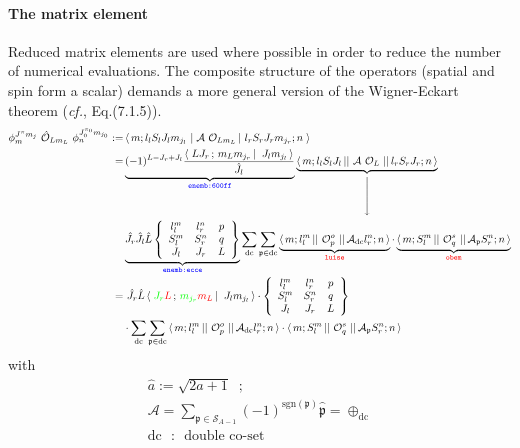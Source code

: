 \documentclass[onecolumn,preprint,superscriptaddress,nofootinbib,notitlepage,10pt,linenumbers]{revtex4-1}
\newcommand{\xdownarrow}[1]{%
  {\left\downarrow\vbox to #1{}\right.\kern-\nulldelimiterspace}
}
\newcommand{\red}[1]{\textcolor{red}{#1}}
\newcommand{\blue}[1]{\textcolor{blue}{#1}}
\newcommand{\green}[1]{\textcolor{green}{#1}}
\newcommand{\cf}{\textit{cf.}\;}
\newcommand{\la}{\label}
\newcommand{\me}[3] {\left\langle\,#1\,\left|\left.\,#2\,\right|\,#3\,\right.\right\rangle}
\newcommand{\redme}[3] {\left\langle\,#1\,\middle|\right|\,#2\,\left|\middle|\,#3\,\right\rangle}
\newcommand{\clg}[6]{\ensuremath{\left\langle\left.\,#1#2\,;\,#3#4\,\right\vert\right.\left.\,#5#6\,\right\rangle}}
\begin{document}
\paragraph{The matrix element}
Reduced matrix elements are used where possible in order to reduce the number of numerical evaluations.
The composite structure of the operators (spatial and spin form a scalar) demands a more general version
of the Wigner-Eckart theorem (\cf\cite{edmonds_book}, Eq.(7.1.5)).
\begin{align}\la{eq.me}
\phi^{J^\pi m_j}_m~\hat{\mathcal{O}}_{Lm_L}~\phi^{J_0^{\pi_0}m_{j_0}}_n:=&
\me{m;l_lS_lJ_lm_{j_l}}{\mathcal{A}~\mathcal{O}_{Lm_L}}{l_rS_rJ_rm_{j_r};n} \\
=&\underbrace{(-1)^{L-J_r+J_l}\frac{\clg{L}{J_r}{m_L}{m_{j_r}}{J_l}{m_{j_l}}}{\hat{J_l}}}_
{\blue{\texttt{enemb:600ff}}}
\underbrace{\redme{m;l_lS_lJ_l}{\mathcal{A}~\mathcal{O}_{L}}{l_rS_rJ_r;n}}_{\xdownarrow{.75cm}}\\
&\underbrace{\hat{J_r}\hat{J_l}\hat{L}
\left\lbrace\begin{array}{ccc}l^m_l & l^n_r & p\\ S^m_l & S^n_r & q \\ J_l & J_r & L\end{array}\right\rbrace}_{\blue{\texttt{enemb:ecce}}}
\sum_\text{dc}\sum_{\mathfrak{p}\in\text{dc}}
\underbrace{\redme{m;l^m_l}{\mathcal{O}^o_p}{\mathcal{A}_\text{dc}l^n_r;n}}_{\red{\texttt{luise}}}\cdot
\underbrace{\redme{m;S^m_l}{\mathcal{O}^s_q}{\mathcal{A}_\mathfrak{p}S^n_r;n}}_{\red{\texttt{obem}}}\\
=&~\hat{J_r}\hat{L}\clg{\green{J_r}}{\red{L}}{\green{m_{j_r}}}{\red{m_L}}{J_l}{m_{j_l}}\cdot
\left\lbrace\begin{array}{ccc}l^m_l & l^n_r & p\\ S^m_l & S^n_r & q \\ J_l & J_r & L\end{array}\right\rbrace\\
&\cdot\sum_\text{dc}\sum_{\mathfrak{p}\in\text{dc}}
\redme{m;l^m_l}{\mathcal{O}^o_p}{\mathcal{A}_\text{dc}l^n_r;n}\cdot
\redme{m;S^m_l}{\mathcal{O}^s_q}{\mathcal{A}_\mathfrak{p}S^n_r;n}
\end{align}
with
\begin{align}\la{eq.liteq.mat.descr}
\hat{a}:=\sqrt{2a+1}\;\;;\\
\mathcal{A}=\sum_{\mathfrak{p}\in\mathcal{S}_{A-1}}(-1)^{\text{sgn}(\mathfrak{p})}\hat{\mathfrak{p}}=\oplus_\text{dc}\\
\text{dc ~:~ double co-set}
\end{align}
\end{document}
